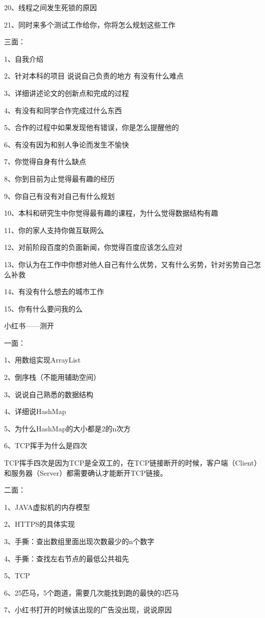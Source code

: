 \documentclass[UTF8]{ctexart}
\begin{document}
20、线程之间发生死锁的原因

21、同时来多个测试工作给你，你将怎么规划这些工作

三面：

1、自我介绍

2、针对本科的项目 说说自己负责的地方 有没有什么难点

3、详细讲述论文的创新点和完成的过程

4、有没有和同学合作完成过什么东西

5、合作的过程中如果发现他有错误，你是怎么提醒他的

6、有没有因为和别人争论而发生不愉快

7、你觉得自身有什么缺点

8、你到目前为止觉得最有趣的经历

9、你自己有没有对自己有什么规划

10、本科和研究生中你觉得最有趣的课程，为什么觉得数据结构有趣

11、你的家人支持你做互联网么

12、对前阶段百度的负面新闻，你觉得百度应该怎么应对

13、你认为在工作中你想对他人自己有什么优势，又有什么劣势，针对劣势自己怎么补救

14、有没有什么想去的城市工作

15、你有什么要问我的么

小红书——测开

一面：

1、用数组实现ArrayList

2、倒序栈（不能用辅助空间）

3、说说自己熟悉的数据结构

4、详细说HashMap

5、为什么HashMap的大小都是2的n次方

6、TCP挥手为什么是四次

TCP挥手四次是因为TCP是全双工的，在TCP链接断开的时候，客户端（Client）和服务器（Server）都需要确认才能断开TCP链接。

二面：

1、JAVA虚拟机的内存模型

2、HTTPS的具体实现

3、手撕：查出数组里面出现次数最少的n个数字

4、手撕：查找左右节点的最低公共祖先

5、TCP

6、25匹马，5个跑道，需要几次能找到跑的最快的3匹马

7、小红书打开的时候该出现的广告没出现，说说原因
\end{document}

